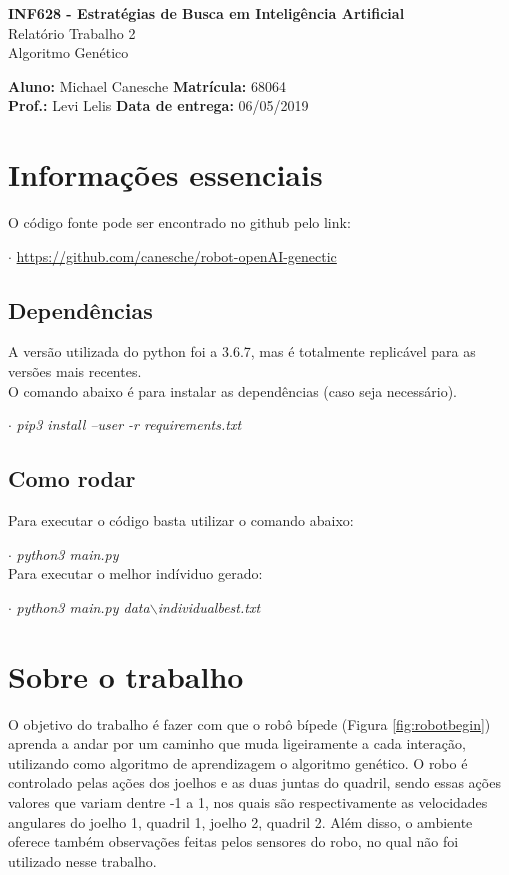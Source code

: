 \documentclass[article, a4paper, 12pt]{article}
\begin{document}
	\onehalfspacing	
	\begin{center}
		\large{\textbf{INF628 - Estratégias de Busca em Inteligência Artificial}} \\
		\Large{Relatório Trabalho 2 \\ Algoritmo Genético}
	\end{center}
	\begin{large}
		\textbf{Aluno:} Michael Canesche \hspace{2cm} \textbf{Matrícula:} 68064 \\ \textbf{Prof.:} Levi Lelis \hspace{4cm} \textbf{Data de entrega:} 06/05/2019
	\end{large}


\section{Informações essenciais}

O código fonte pode ser encontrado no github pelo link: 

$\cdot$ \url{https://github.com/canesche/robot-openAI-genectic}

\subsection{Dependências}

A versão utilizada do python foi a 3.6.7, mas é totalmente replicável para as versões mais recentes.\\
O comando abaixo é para instalar as dependências (caso seja necessário).

$\cdot$ \textit{pip3 install --user -r requirements.txt}

\subsection{Como rodar}

Para executar o código basta utilizar o comando abaixo:

$\cdot$ \textit{python3 main.py}\\
Para executar o melhor indíviduo gerado:

$\cdot$ \textit{python3 main.py data$\backslash$individualbest.txt}

\section{Sobre o trabalho}

\hspace{1cm}O objetivo do trabalho é fazer com que o robô bípede (Figura \ref{fig:robotbegin}) aprenda a andar por um caminho que muda ligeiramente a cada interação, utilizando como algoritmo de aprendizagem o algoritmo genético. O robo é controlado pelas ações dos joelhos e as duas juntas do quadril, sendo essas ações valores que variam dentre -1 a 1, nos quais são respectivamente as velocidades angulares do joelho 1, quadril 1, joelho 2, quadril 2. Além disso, o ambiente oferece também observações feitas pelos sensores do robo, no qual não foi utilizado nesse trabalho.
\end{document}
